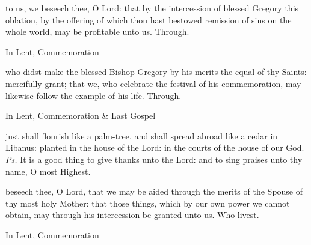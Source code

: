 
\secret
{} to us, we beseech thee, O Lord: that by the intercession of blessed Gregory this oblation, by the offering of which thou hast bestowed remission of sins on the whole world, may be profitable unto us. Through.
\begin{rubric}
    In Lent, Commemoration %
\end{rubric}


\postcommunion
{} who didst make the blessed Bishop Gregory by his merits the equal of thy Saints: mercifully grant; that we, who celebrate the festival of his commemoration, may likewise follow the example of his life. Through.

\begin{rubric}
    In Lent, Commemoration \& Last Gospel 
\end{rubric}


\clearpage
{}

\introit
{} just shall flourish like a palm-tree, and shall spread abroad like a cedar in Libanus: planted in the house of the Lord: in the courts of the house of our God. \textit{Ps.} It is a good thing to give thanks unto the Lord: and to sing praises unto thy name, O most Highest.

\collect
{} beseech thee, O Lord, that we may be aided through the merits of the Spouse of thy most holy Mother: that those things, which by our own power we cannot obtain, may through his intercession be granted unto us. Who livest.
\begin{rubric}
    In Lent, Commemoration 
\end{rubric}

